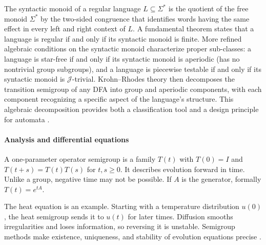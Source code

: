 The syntactic monoid of a regular language $L\subseteq\Sigma^*$ is the quotient of the free monoid $\Sigma^*$ by the two-sided congruence that identifies words having the same effect in every left and right context of $L$. A fundamental theorem states that a language is regular if and only if its syntactic monoid is finite. More refined algebraic conditions on the syntactic monoid characterize proper sub-classes: a language is star-free if and only if its syntactic monoid is aperiodic (has no nontrivial group subgroups), and a language is piecewise testable if and only if its syntactic monoid is $\mathcal J$-trivial. Krohn--Rhodes theory then decomposes the transition semigroup of any DFA into group and aperiodic components, with each component recognizing a specific aspect of the language's structure. This algebraic decomposition provides both a classification tool and a design principle for automata \cite{semigroup_ref2,semigroup_ref3}.

\paragraph{Analysis and differential equations}
A one-parameter operator semigroup is a family $T(t)$ with $T(0)=I$ and $T(t+s)=T(t)T(s)$ for $t,s\geq0$. It describes evolution forward in time. Unlike a group, negative time may not be possible. If $A$ is the generator, formally $T(t)=e^{tA}$.

The heat equation is an example. Starting with a temperature distribution $u(0)$, the heat semigroup sends it to $u(t)$ for later times. Diffusion smooths irregularities and loses information, so reversing it is unstable. Semigroup methods make existence, uniqueness, and stability of evolution equations precise \cite{semigroup_ref4}.

